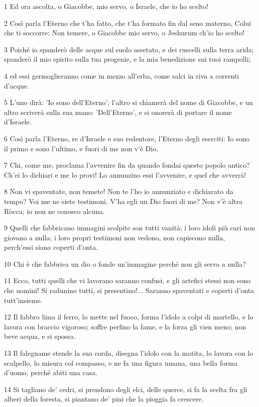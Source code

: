 \par 1 Ed ora ascolta, o Giacobbe, mio servo, o Israele, che io ho scelto!
\par 2 Così parla l'Eterno che t'ha fatto, che t'ha formato fin dal seno materno, Colui che ti soccorre: Non temere, o Giacobbe mio servo, o Jeshurum ch'io ho scelto!
\par 3 Poiché io spanderò delle acque sul suolo assetato, e dei ruscelli sulla terra arida; spanderò il mio spirito sulla tua progenie, e la mia benedizione sui tuoi rampolli;
\par 4 ed essi germoglieranno come in mezzo all'erba, come salci in riva a correnti d'acque.
\par 5 L'uno dirà: 'Io sono dell'Eterno'; l'altro si chiamerà del nome di Giacobbe, e un altro scriverà sulla sua mano: 'Dell'Eterno', e si onorerà di portare il nome d'Israele.
\par 6 Così parla l'Eterno, re d'Israele e suo redentore, l'Eterno degli eserciti: Io sono il primo e sono l'ultimo, e fuori di me non v'è Dio.
\par 7 Chi, come me, proclama l'avvenire fin da quando fondai questo popolo antico? Ch'ei lo dichiari e me lo provi! Lo annunzino essi l'avvenire, e quel che avverrà!
\par 8 Non vi spaventate, non temete! Non te l'ho io annunziato e dichiarato da tempo? Voi me ne siete testimoni. V'ha egli un Dio fuori di me? Non v'è altra Ròcca; io non ne conosco alcuna.
\par 9 Quelli che fabbricano immagini scolpite son tutti vanità; i loro idoli più cari non giovano a nulla; i loro propri testimoni non vedono, non capiscono nulla, perch'essi siano coperti d'onta.
\par 10 Chi è che fabbrica un dio o fonde un'immagine perché non gli serva a nulla?
\par 11 Ecco, tutti quelli che vi lavorano saranno confusi, e gli artefici stessi non sono che uomini! Si radunino tutti, si presentino!... Saranno spaventati e coperti d'onta tutt'insieme.
\par 12 Il fabbro lima il ferro, lo mette nel fuoco, forma l'idolo a colpi di martello, e lo lavora con braccio vigoroso; soffre perfino la fame, e la forza gli vien meno; non beve acqua, e si spossa.
\par 13 Il falegname stende la sua corda, disegna l'idolo con la matita, lo lavora con lo scalpello, lo misura col compasso, e ne fa una figura umana, una bella forma d'uomo, perché abiti una casa.
\par 14 Si tagliano de' cedri, si prendono degli elci, delle querce, si fa la scelta fra gli alberi della foresta, si piantano de' pini che la pioggia fa crescere.
